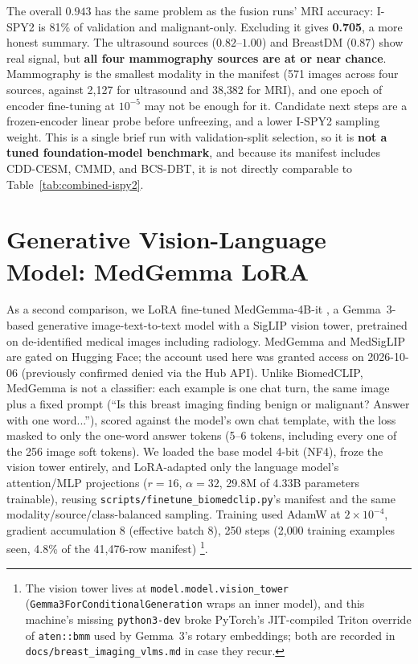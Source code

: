 \documentclass[11pt]{article}
\begin{document}
The overall $0.943$ has the same problem as the fusion runs' MRI accuracy:
I-SPY2 is 81\% of validation and malignant-only. Excluding it gives
\textbf{0.705}, a more honest summary. The ultrasound sources
($0.82$--$1.00$) and BreastDM ($0.87$) show real signal, but \textbf{all
four mammography sources are at or near chance}. Mammography is the
smallest modality in the manifest (571 images across four sources, against
2{,}127 for ultrasound and 38{,}382 for MRI), and one epoch of encoder
fine-tuning at $10^{-5}$ may not be enough for it. Candidate next steps are
a frozen-encoder linear probe before unfreezing, and a lower I-SPY2
sampling weight. This is a single brief run with validation-split
selection, so it is \textbf{not a tuned foundation-model benchmark}, and
because its manifest includes CDD-CESM, CMMD, and BCS-DBT, it is not
directly comparable to Table~\ref{tab:combined-ispy2}.

\section{Generative Vision-Language Model: {MedGemma} {LoRA}}
\label{sec:medgemma}

As a second comparison, we LoRA fine-tuned MedGemma-4B-it
\citep{sellergren2025medgemma}, a Gemma~3-based generative
image-text-to-text model with a SigLIP vision tower, pretrained on
de-identified medical images including radiology. MedGemma and MedSigLIP
are gated on Hugging Face; the account used here was granted access on
2026-10-06 (previously confirmed denied via the Hub API). Unlike
BiomedCLIP, MedGemma is not a classifier: each example is one chat turn,
the same image plus a fixed prompt (``Is this breast imaging finding
benign or malignant? Answer with one word...''), scored against the
model's own chat template, with the loss masked to only the one-word
answer tokens (5--6 tokens, including every one of the 256 image soft
tokens). We loaded the base model 4-bit (NF4), froze the vision tower
entirely, and LoRA-adapted only the language model's attention/MLP
projections ($r{=}16$, $\alpha{=}32$, 29.8M of 4.33B parameters trainable),
reusing \nolinkurl{scripts/finetune_biomedclip.py}'s manifest and the same
modality/source/class-balanced sampling. Training used AdamW at $2\times
10^{-4}$, gradient accumulation 8 (effective batch 8), 250 steps (2{,}000
training examples seen, 4.8\% of the 41{,}476-row manifest)
\footnote{The vision tower lives at \texttt{model.model.vision\_tower}
(\texttt{Gemma3ForConditionalGeneration} wraps an inner model), and this
machine's missing \texttt{python3-dev} broke PyTorch's {JIT}-compiled
{Triton} override of \texttt{aten::bmm} used by Gemma~3's rotary
embeddings; both are recorded in
\nolinkurl{docs/breast\_imaging\_vlms.md} in case they recur.}.
\end{document}
